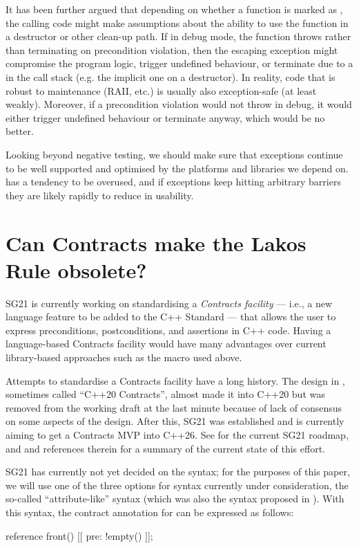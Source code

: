 It has been further argued that depending on whether a function is marked as , the calling code might make assumptions about the ability to use the function in a destructor or other clean-up path. If in debug mode, the function throws rather than terminating on precondition violation, then the escaping exception might compromise the program logic, trigger undefined behaviour, or terminate due to a  in the call 
stack (e.g. the implicit one on a destructor). In reality, code that is robust to maintenance (RAII, etc.) is usually also exception-safe (at least weakly). Moreover, if a precondition violation would not throw in debug, it would either trigger undefined behaviour or terminate anyway, which would be no better.

Looking beyond negative testing, we should make sure that exceptions continue to be well supported and optimised by the platforms and libraries we depend on.   has a tendency to be overused, and if exceptions keep hitting arbitrary  barriers they are likely rapidly to reduce in usability.

\section{Can Contracts make the Lakos Rule obsolete?}
\label{sec:contracts}

SG21 is currently working on standardising a \emph{Contracts facility} --- i.e., a new language feature to be added to the C++ Standard --- that allows the user to express preconditions, postconditions, and assertions in C++ code. Having a language-based Contracts facility would have many advantages over current library-based approaches such as the  macro used above.

Attempts to standardise a Contracts facility have a long history. The design in \cite{P0542R5}, sometimes called ``C++20 Contracts'', almost made it into C++20 but was removed from the working draft at the last minute because of lack of consensus on some aspects of the design. After this, SG21 was established and is currently aiming to get a Contracts MVP into C++26. See \cite{P2695R1} for the current SG21 roadmap, and \cite{P2521R3} and references therein for a summary of the current state of this effort.

SG21 has currently not yet decided on the syntax; for the purposes of this paper, we will use one of the three options for syntax currently under consideration, the so-called ``attribute-like'' syntax (which was also the syntax proposed in \cite{P0542R5}). With this syntax, the contract annotation for  can be expressed as follows:
\begin{codeblock}
reference front() [[ pre: !empty() ]];
\end{codeblock}

